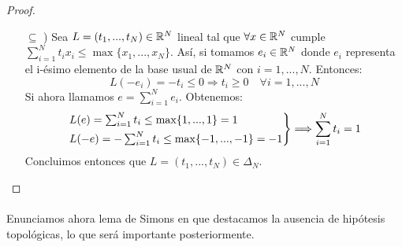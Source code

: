 \begin{proof}
\begin{itemize}
			\item[$ \subseteq $ )] Sea $ L =  (t_1,...,t_N) \in \mathbb{R}^N $ lineal tal que $ \forall x \in \mathbb{R}^N $ cumple $ \sum_{i=1}^{N}{t_i x_i} \leq \max\{x_1,...,x_N\}$. Así, si tomamos $ e_i \in \mathbb{R}^N $ donde $ e_i $ representa el i-ésimo elemento de la base usual de $ \mathbb{R}^N $ con $ i=1,...,N $. Entonces:   		
			\begin{equation*}
				L(-e_i) = -t_i \leq 0 \Longrightarrow t_i \geq 0 \quad \forall i=1,...,N
			\end{equation*}
			Si ahora llamamos $ e = \sum_{i=1}^{N}{e_i} $. Obtenemos:
			\begin{equation*}
				\begin{rcases*}
				L(e) = \sum_{i=1}^{N}{t_i} \leq \max \{1, ...,1\} = 1 \\
				L(-e) = -\sum_{i=1}^{N}{t_i} \leq \max \{-1, ...,-1\} = -1
				\end{rcases*} \Longrightarrow \sum_{i=1}^{N}{t_i} = 1
			\end{equation*}
			Concluimos entonces que $ L =  (t_1,...,t_N) \in \Delta_N $.
		\end{itemize}
		
	\end{proof}

	\paragraph{} Enunciamos ahora lema de Simons\cite{Simons2008} en que destacamos la ausencia de hipótesis topológicas, lo que será importante posteriormente.
	
